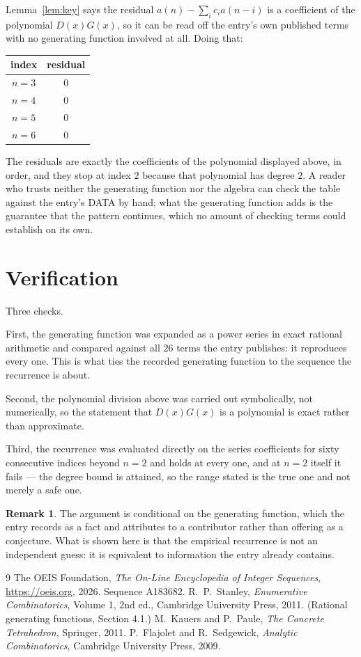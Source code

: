 \documentclass[11pt,a4paper]{article}
\theoremstyle{plain}
\theoremstyle{definition}
\newtheorem{remark}[theorem]{Remark}
\begin{document}
Lemma~\ref{lem:key} says the residual $a(n)-\sum_ic_ia(n-i)$ is a coefficient of the
polynomial $D(x)G(x)$, so it can be read off the entry's own published terms with no
generating function involved at all. Doing that:
\begin{center}
\begin{tabular}{cc}
index & residual \\ \hline
$n=3$ & $0$ \\
$n=4$ & $0$ \\
$n=5$ & $0$ \\
$n=6$ & $0$
\end{tabular}
\end{center}
The residuals are exactly the coefficients of the polynomial displayed above, in order, and
they stop at index $2$ because that polynomial has degree $2$. A reader who trusts
neither the generating function nor the algebra can check the table against the entry's DATA
by hand; what the generating function adds is the guarantee that the pattern continues, which
no amount of checking terms could establish on its own.

\section{Verification}

Three checks.

First, the generating function was expanded as a power series in exact rational arithmetic and
compared against all $26$ terms the entry publishes: it reproduces every one. This is
what ties the recorded generating function to the sequence the recurrence is about.

Second, the polynomial division above was carried out symbolically, not numerically, so the
statement that $D(x)G(x)$ is a polynomial is exact rather than approximate.

Third, the recurrence was evaluated directly on the series coefficients for sixty consecutive
indices beyond $n=2$ and holds at every one, and at $n=2$ itself it fails --- the
degree bound is attained, so the range stated is the true one and not merely a safe one.

\begin{remark}
The argument is conditional on the generating function, which the entry records as a fact and
attributes to a contributor rather than offering as a conjecture. What is shown here is that
the empirical recurrence is not an independent guess: it is equivalent to information the
entry already contains.
\end{remark}

\begin{thebibliography}{9}
 The OEIS Foundation, \emph{The On-Line Encyclopedia of Integer
Sequences}, \url{https://oeis.org}, 2026. Sequence A183682.
 R.~P.~Stanley, \emph{Enumerative Combinatorics}, Volume 1, 2nd ed.,
Cambridge University Press, 2011. (Rational generating functions, Section 4.1.)
 M.~Kauers and P.~Paule, \emph{The Concrete Tetrahedron}, Springer, 2011.
 P.~Flajolet and R.~Sedgewick, \emph{Analytic Combinatorics}, Cambridge
University Press, 2009.
\end{thebibliography}
\end{document}
